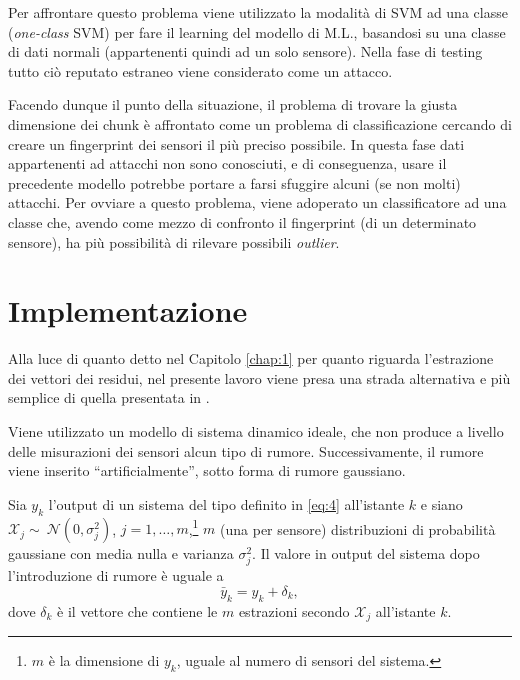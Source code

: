 \documentclass[Lau,binding=0.6cm]{sapthesis}
\begin{document}
Per affrontare questo problema viene utilizzato la modalit\`a di SVM ad una classe (\textit{one-class} SVM) per fare il learning del modello di M.L., basandosi su una classe di dati normali (appartenenti quindi ad un solo sensore). 
Nella fase di testing tutto ci\`o reputato estraneo viene considerato come un attacco.

Facendo dunque il punto della situazione, il problema di trovare la giusta dimensione dei chunk \`e affrontato come un problema di classificazione cercando di creare un fingerprint dei sensori il pi\`u preciso possibile.
In questa fase dati appartenenti ad attacchi non sono conosciuti, e di conseguenza, usare il precedente modello potrebbe portare a farsi sfuggire alcuni (se non molti) attacchi.
Per ovviare a questo problema, viene adoperato un classificatore ad una classe che, avendo come mezzo di confronto il fingerprint (di un determinato sensore), ha pi\`u possibilit\`a di rilevare possibili \textit{outlier}.


\chapter{Implementazione}\label{chap:4}
Alla luce di quanto detto nel Capitolo \ref{chap:1} per quanto riguarda l'estrazione dei vettori dei residui, nel presente lavoro viene presa una strada alternativa e pi\`u semplice di quella presentata in \cite{ahmed2018noise}.

Viene utilizzato un modello di sistema dinamico ideale, che non produce a livello delle misurazioni dei sensori alcun tipo di rumore. Successivamente, il rumore viene inserito ``artificialmente'', sotto forma di rumore gaussiano.

Sia $y_k$ l'output di un sistema del tipo definito in \ref{eq:4} all'istante $k$ e siano $\mathcal{X}_j \sim~\mathcal{N}(0,\sigma_j^2)$, $j = 1,\ldots,m$,\footnote{$m$ \`e la dimensione di $y_k$, uguale al numero di sensori del sistema.} $m$ (una per sensore) distribuzioni di probabilit\`a gaussiane con media nulla e varianza $\sigma_j^2$.
Il valore in output del sistema dopo l'introduzione di rumore \`e uguale a
\begin{equation}
    \bar{y}_k = y_k + \delta_k\label{eq:6},
\end{equation}
dove $\delta_k$ \`e il vettore che contiene le $m$ estrazioni secondo $\mathcal{X}_j$ all'istante $k$.
\end{document}
